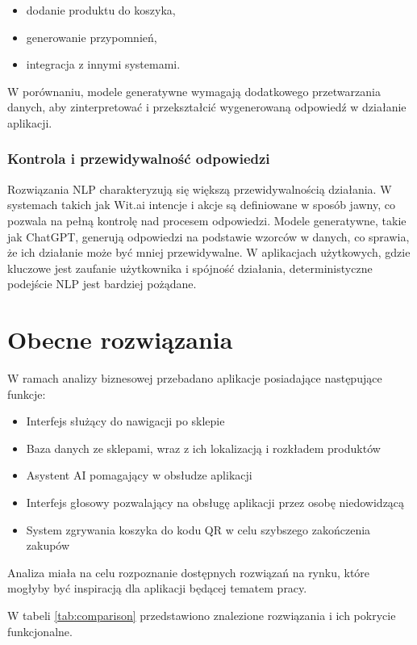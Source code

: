 \begin{itemize}
    \item dodanie produktu do koszyka,
    \item generowanie przypomnień,
    \item integracja z innymi systemami.
\end{itemize}
W porównaniu, modele generatywne wymagają dodatkowego przetwarzania danych, aby zinterpretować i przekształcić wygenerowaną odpowiedź w działanie aplikacji.

\subsubsection{Kontrola i przewidywalność odpowiedzi}

Rozwiązania NLP charakteryzują się większą przewidywalnością działania. W systemach takich jak Wit.ai intencje i akcje są definiowane w sposób jawny, co pozwala na pełną kontrolę nad procesem odpowiedzi. Modele generatywne, takie jak ChatGPT, generują odpowiedzi na podstawie wzorców w danych, co sprawia, że ich działanie może być mniej przewidywalne. W aplikacjach użytkowych, gdzie kluczowe jest zaufanie użytkownika i spójność działania, deterministyczne podejście NLP jest bardziej pożądane.

\section{Obecne rozwiązania}
\label{subsec:obecne_rozwiazania}

W ramach analizy biznesowej przebadano aplikacje posiadające następujące funkcje:

\begin{itemize}
    \item Interfejs służący do nawigacji po sklepie
    \item Baza danych ze sklepami, wraz z ich lokalizacją i rozkładem produktów
    \item Asystent AI pomagający w obsłudze aplikacji
    \item Interfejs głosowy pozwalający na obsługę aplikacji przez osobę niedowidzącą
    \item System zgrywania koszyka do kodu QR w celu szybszego zakończenia zakupów
\end{itemize}
Analiza miała na celu rozpoznanie dostępnych rozwiązań na rynku, które mogłyby być inspiracją dla aplikacji będącej tematem pracy.


W tabeli \ref{tab:comparison} przedstawiono znalezione rozwiązania i ich pokrycie funkcjonalne.

